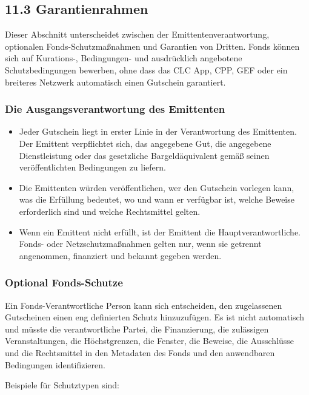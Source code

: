 \documentclass[11pt]{article}
\begin{document}
\subsection*{11.3 Garantienrahmen}

Dieser Abschnitt unterscheidet zwischen der Emittentenverantwortung, optionalen Fonds-Schutzmaßnahmen und Garantien von Dritten. Fonds können sich auf Kurations-, Bedingungen- und ausdrücklich angebotene Schutzbedingungen bewerben, ohne dass das CLC App, CPP, GEF oder ein breiteres Netzwerk automatisch einen Gutschein garantiert.

\subsubsection*{Die Ausgangsverantwortung des Emittenten}

\begin{itemize}[leftmargin=*]
\item Jeder Gutschein liegt in erster Linie in der Verantwortung des Emittenten. Der Emittent verpflichtet sich, das angegebene Gut, die angegebene Dienstleistung oder das gesetzliche Bargeldäquivalent gemäß seinen veröffentlichten Bedingungen zu liefern.
\item Die Emittenten würden veröffentlichen, wer den Gutschein vorlegen kann, was die Erfüllung bedeutet, wo und wann er verfügbar ist, welche Beweise erforderlich sind und welche Rechtsmittel gelten.
\item Wenn ein Emittent nicht erfüllt, ist der Emittent die Hauptverantwortliche. Fonds- oder Netzschutzmaßnahmen gelten nur, wenn sie getrennt angenommen, finanziert und bekannt gegeben werden.
\end{itemize}
\subsubsection*{Optional Fonds-Schutze}

Ein Fonds-Verantwortliche Person kann sich entscheiden, den zugelassenen Gutscheinen einen eng definierten Schutz hinzuzufügen. Es ist nicht automatisch und müsste die verantwortliche Partei, die Finanzierung, die zulässigen Veranstaltungen, die Höchstgrenzen, die Fenster, die Beweise, die Ausschlüsse und die Rechtsmittel in den Metadaten des Fonds und den anwendbaren Bedingungen identifizieren.

Beispiele für Schutztypen sind:
\end{document}
